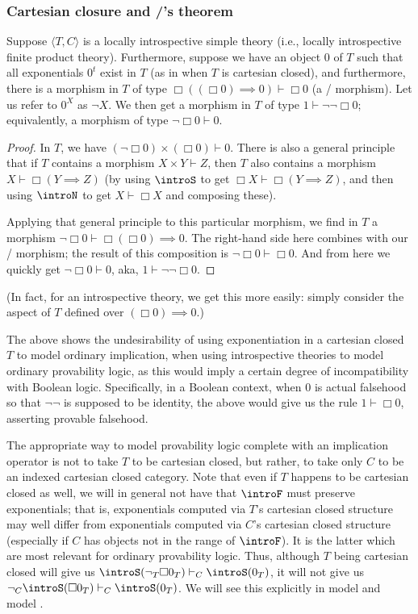 \subsubsection{Cartesian closure and \Loeb/'s theorem}
\begin{theorem}
Suppose $\langle T, C \rangle$ is a locally introspective simple theory (i.e., locally introspective finite product theory). Furthermore, suppose we have an object $0$ of $T$ such that all exponentials $0^t$ exist in $T$ (as in when $T$ is cartesian closed), and furthermore, there is a morphism in $T$ of type $\Box ((\Box 0) \implies 0) \vdash \Box 0$ (a \Loeb/ morphism). Let us refer to $0^X$ as $\neg X$. We then get a morphism in $T$ of type $1 \vdash \neg \neg \Box 0$; equivalently, a morphism of type $\neg \Box 0 \vdash 0$.
\end{theorem}
\begin{proof}
In $T$, we have $(\neg \Box 0) \times (\Box 0) \vdash 0$. There is also a general principle that if $T$ contains a morphism $X \times Y \vdash Z$, then $T$ also contains a morphism $X \vdash \Box (Y \implies Z)$ (by using $\introS$ to get $\Box X \vdash \Box(Y \implies Z)$, and then using $\introN$ to get $X \vdash \Box X$ and composing these).

Applying that general principle to this particular morphism, we find in $T$ a morphism $\neg \Box 0 \vdash \Box (\Box 0) \implies 0$. The right-hand side here combines with our \Loeb/ morphism; the result of this composition is $\neg \Box 0 \vdash \Box 0$. And from here we quickly get $\neg \Box 0 \vdash 0$, aka, $1 \vdash \neg \neg \Box 0$.
\end{proof}

(In fact, for an introspective theory, we get this more easily: simply consider the aspect of $T$ defined over $(\Box 0) \implies 0$.)

The above shows the undesirability of using exponentiation in a cartesian closed $T$ to model ordinary implication, when using introspective theories to model ordinary provability logic, as this would imply a certain degree of incompatibility with Boolean logic. Specifically, in a Boolean context, when $0$ is actual falsehood so that $\neg \neg$ is supposed to be identity, the above would give us the rule $1 \vdash \Box 0$, asserting provable falsehood.

The appropriate way to model provability logic complete with an implication operator is not to take $T$ to be cartesian closed, but rather, to take only $C$ to be an indexed cartesian closed category. Note that even if $T$ happens to be cartesian closed as well, we will in general not have that $\introF$ must preserve exponentials; that is, exponentials computed via $T$'s cartesian closed structure may well differ from exponentials computed via $C$'s cartesian closed structure (especially  if $C$ has objects not in the range of $\introF$). It is the latter which are most relevant for ordinary provability logic. Thus, although $T$ being cartesian closed will give us $\introS(\neg_T \Box 0_T) \vdash_C \introS(0_T)$, it will not give us $\neg_C \introS(\Box 0_T) \vdash_C \introS(0_T)$. We will see this explicitly in model \TODO and model \TODO.

